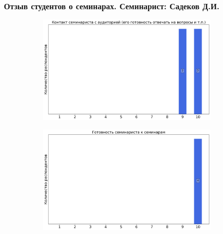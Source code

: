     \subsubsection{Отзыв студентов о семинарах. Семинарист: Садеков Д.И.}
        \begin{figure}[H]
            \centering
            \begin{subfigure}[b]{0.45\textwidth}
                \centering
                \includegraphics[width=\textwidth]{images/4 course/Квантовая механика/seminarists-marks-Садеков Д.И.-0.png}
            \end{subfigure}
            \begin{subfigure}[b]{0.45\textwidth}
                \centering
                \includegraphics[width=\textwidth]{images/4 course/Квантовая механика/seminarists-marks-Садеков Д.И.-1.png}
            \end{subfigure}
            \begin{subfigure}[b]{0.45\textwidth}
                \centering

\end{subfigure}
\end{figure}
